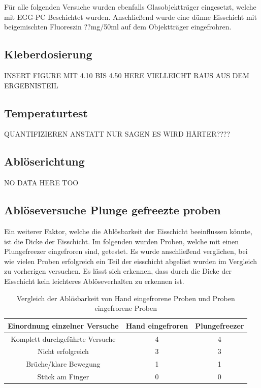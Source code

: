Für alle folgenden Versuche wurden ebenfalls Glasobjektträger eingesetzt, welche mit EGG-PC Beschichtet wurden. Anschließend wurde eine dünne Eisschicht mit beigemischten Fluoreszin ??mg/50ml auf dem Objektträger eingefrohren.

\subsection{Kleberdosierung}

INSERT FIGURE MIT 4.10 BIS 4.50 HERE VIELLEICHT RAUS AUS DEM ERGEBNISTEIL
	
\subsection{Temperaturtest}

QUANTIFIZIEREN ANSTATT NUR SAGEN ES WIRD HÄRTER????

\subsection{Ablöserichtung}

NO DATA HERE TOO

\subsection{Ablöseversuche Plunge gefreezte proben}

Ein weiterer Faktor, welche die Ablösbarkeit der Eisschicht beeinflussen könnte, ist die Dicke der Eisschicht. Im folgenden wurden Proben, welche mit einen Plungefreezer eingefroren sind, getestet. Es wurde anschließend verglichen, bei wie vielen Proben erfolgreich ein Teil der eisschicht abgelöst wurden im Vergleich zu vorherigen versuchen. Es lässt sich erkennen, dass durch die Dicke der Eisschicht kein leichteres Ablöseverhalten zu erkennen ist.

\begin{table}
	\centering
	\begin{tabular}{|c|c|c|}
		\hline
		Einordnung einzelner Versuche& Hand eingefroren & Plungefreezer \\
		\hline
		\hline
		Komplett durchgeführte Versuche & 4 & 4\\
		\hline
		Nicht erfolgreich & 3 & 3\\
		\hline
		Brüche/klare Bewegung & 1 & 1\\
		\hline
		Stück am Finger & 0 & 0\\
		\hline		
	\end{tabular}
	\caption{Vergleich der Ablösbarkeit von Hand eingefrorene Proben und Proben eingefrorene Proben}
\end{table}

